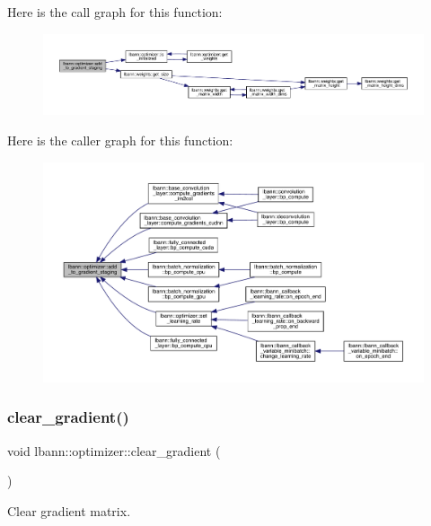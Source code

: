 Here is the call graph for this function\+:\nopagebreak
\begin{figure}[H]
\begin{center}
\leavevmode
\includegraphics[width=350pt]{classlbann_1_1optimizer_ac23ebde61a225f70c27ab937df5755ed_cgraph}
\end{center}
\end{figure}
Here is the caller graph for this function\+:\nopagebreak
\begin{figure}[H]
\begin{center}
\leavevmode
\includegraphics[width=350pt]{classlbann_1_1optimizer_ac23ebde61a225f70c27ab937df5755ed_icgraph}
\end{center}
\end{figure}
\mbox{\label{classlbann_1_1optimizer_a3f41360479fbd46c704342bb4ef36d09}} 
\subsubsection{\texorpdfstring{clear\+\_\+gradient()}{clear\_gradient()}}
{\footnotesize\ttfamily void lbann\+::optimizer\+::clear\+\_\+gradient (\begin{DoxyParamCaption}{ }\end{DoxyParamCaption})}

Clear gradient matrix. 

